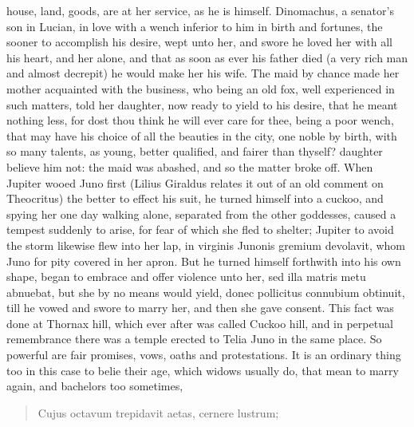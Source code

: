house, land, goods, are at her service, as he is himself. Dinomachus, a
senator's son in Lucian, in love with a wench inferior to him in
birth and fortunes, the sooner to accomplish his desire, wept unto her,
and swore he loved her with all his heart, and her alone, and that as
soon as ever his father died (a very rich man and almost decrepit) he
would make her his wife. The maid by chance made her mother acquainted
with the business, who being an old fox, well experienced in such
matters, told her daughter, now ready to yield to his desire, that he
meant nothing less, for dost thou think he will ever care for thee,
being a poor wench, that may have his choice of all the beauties
in the city, one noble by birth, with so many talents, as young, better
qualified, and fairer than thyself? daughter believe him not: the maid
was abashed, and so the matter broke off. When Jupiter wooed Juno first
(Lilius Giraldus relates it out of an old comment on Theocritus) the
better to effect his suit, he turned himself into a cuckoo, and spying
her one day walking alone, separated from the other goddesses, caused a
tempest suddenly to arise, for fear of which she fled to shelter;
Jupiter to avoid the storm likewise flew into her lap, in virginis
Junonis gremium devolavit, whom Juno for pity covered in her
apron. But he turned himself forthwith into his own shape, began
to embrace and offer violence unto her, sed illa matris metu abnuebat,
but she by no means would yield, donec pollicitus connubium obtinuit,
till he vowed and swore to marry her, and then she gave consent. This
fact was done at Thornax hill, which ever after was called Cuckoo hill,
and in perpetual remembrance there was a temple erected to Telia Juno
in the same place. So powerful are fair promises, vows, oaths and
protestations. It is an ordinary thing too in this case to belie their
age, which widows usually do, that mean to marry again, and bachelors
too sometimes,

\begin{latin}
\begin{verse}
Cujus octavum trepidavit aetas,
cernere lustrum;
\end{verse}
\end{latin}

